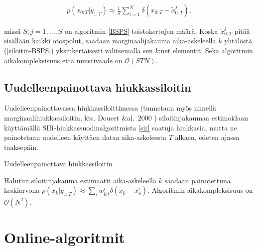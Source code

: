 \documentclass[
  12pt,
  a4paper, twoside]{book}
\begin{document}
\begin{align}\label{siloitin-BSPS}
p(x_{0:T}|y_{1:T}) \approx \frac{1}{S} \sum_{i=1}^N \delta (x_{0:T}-\tilde{x}_{0:T}^j),
\end{align}

\noindent missä \(S, j=1,\ldots,S\) on algoritmin \ref{BSPS} toistokertojen määrä. Koska \(\tilde{x}_{0:T}^j\) pitää sisällään kaikki otospolut, saadaan marginaalijakauma aika-askeleella \(k\) yhtälöstä (\ref{siloitin-BSPS}) yksinkertaisesti valitsemalla sen \(k\):net elementit. Sekä algoritmin aikakompleksisuus että muistivaade on \(\mathcal{O}(STN)\).

\subsection{Uudelleenpainottava hiukkassiloitin}

Uudelleenpainottavassa hiukkassiloittimessa (tunnetaan myös nimellä marginaalihiukkassiloitin, kts. Doucet \&al.~2000 \citep{Doucet-2000}) siloitinjakaumaa estimoidaan käyttämällä SIR-hiukkassuodinalgoritmista \ref{sir} saatuja hiukkasia, mutta ne painotetaan uudelleen käyttäen dataa aika-askeleesta \(T\) alkaen, edeten ajassa taaksepäin.

\begin{algorithm}[H]
\label{rwps}
\DontPrintSemicolon
\SetAlgoShortEnd
{}
\caption{Uudelleenpainottava hiukkassiloitin}
\end{algorithm}

Halutun siloitinjakauma estimaatti aika-askeleella \(k\) saadaan painotettuna keskiarvona \(p(x_k|y_{1:T}) \approx \sum_i w_{k|t}^i \delta (x_k-x_k^i)\). Algoritmin aikakompleksisuus on \(\mathcal{O}(N^2)\).

\section{Online-algoritmit}
\end{document}
